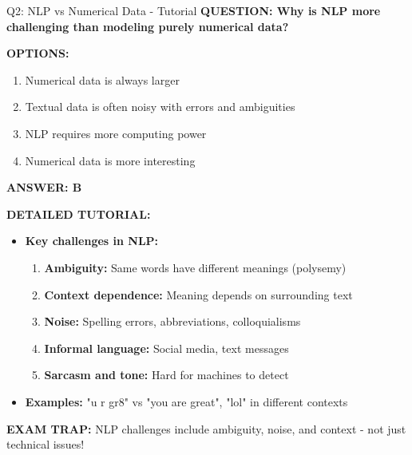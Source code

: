 \documentclass[8pt]{beamer}
\begin{document}
	\begin{frame}{Q2: NLP vs Numerical Data - Tutorial}
		\fontsize{6.5}{7.5}\selectfont
		\textbf{QUESTION: Why is NLP more challenging than modeling purely numerical data?}
		
		\vspace{0.1cm}
		\textbf{OPTIONS:}
		\begin{enumerate}
			\item Numerical data is always larger
			\item Textual data is often noisy with errors and ambiguities
			\item NLP requires more computing power
			\item Numerical data is more interesting
		\end{enumerate}
		
		\vspace{0.1cm}
		\textcolor{myblue}{\textbf{ANSWER: B}}
		
		\vspace{0.1cm}
		\textbf{DETAILED TUTORIAL:}
		\begin{itemize}
			\item \textbf{Key challenges in NLP:}
			\begin{enumerate}
				\item \textbf{Ambiguity:} Same words have different meanings (polysemy)
				\item \textbf{Context dependence:} Meaning depends on surrounding text
				\item \textbf{Noise:} Spelling errors, abbreviations, colloquialisms
				\item \textbf{Informal language:} Social media, text messages
				\item \textbf{Sarcasm and tone:} Hard for machines to detect
			\end{enumerate}
			\item \textbf{Examples:} "u r gr8" vs "you are great", "lol" in different contexts
		\end{itemize}
		
		\textcolor{myred}{\textbf{EXAM TRAP:}} NLP challenges include \textcolor{myblue}{ambiguity, noise, and context} - not just technical issues!
	\end{frame}
	
\end{document}
